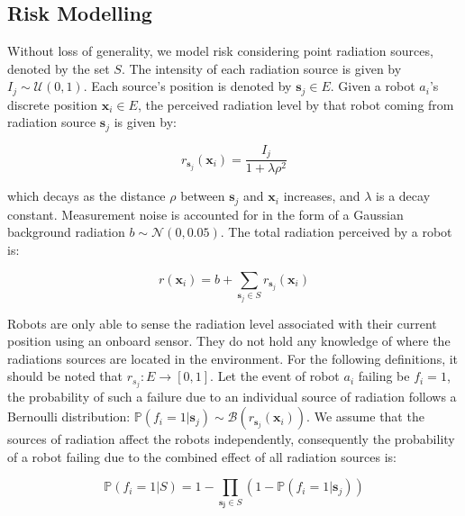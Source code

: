 \subsection{Risk Modelling}
Without loss of generality, we model risk considering point radiation
sources, denoted by the set $S$. The intensity of each radiation
source is given by $I_j\sim\mathcal{U}(0, 1)$. Each source's position
is denoted by $\bm{s}_j \in E$. Given a robot $a_i$'s discrete
position $\bm{x}_i \in E$, the perceived radiation level by that robot coming from radiation source $\bm{s}_j$ is given by:

\begin{equation}
    r_{\bm{s}_j}(\bm{x}_i) = \frac{I_j}{1 + \lambda\rho^2}
    \label{eq:radiation}
\end{equation}

which decays as the distance $\rho$ between $\bm{s}_j$ and $\bm{x}_i$
increases, and $\lambda$ is a decay constant. Measurement noise is
accounted for in the form of a Gaussian background radiation
$b \sim \mathcal{N}(0, 0.05)$. The total radiation perceived by a robot is:

\begin{equation}
    r(\bm{x}_i) = b + \sum_{\bm{s}_j \in S} r_{\bm{s}_j}(\bm{x}_i)
\end{equation}

Robots are only able to sense the radiation level associated with
their current position using an onboard sensor. They do not hold any
knowledge of where the radiations sources are located in the
environment. For the following definitions, it should be noted that
$r_{s_j}: E \rightarrow [0, 1]$.  Let
the event of robot $a_i$ failing be $f_i=1$, the probability of such a
failure due to an individual source of radiation follows a Bernoulli
distribution:
$\mathbb{P}(f_i = 1 | \bm{s}_j) \sim
\mathcal{B}(r_{\bm{s}_j}(\bm{x}_i))$. We assume that the sources of
radiation affect the robots independently, consequently the probability of a
robot failing due to the combined effect of all radiation sources is:

\begin{equation}
    \mathbb{P}(f_i = 1 | S) = 1 - \prod_{\bm{s_j} \in S} (1 - \mathbb{P}(f_i = 1 | \bm{s}_j))
    \label{eq:failure}
\end{equation}

